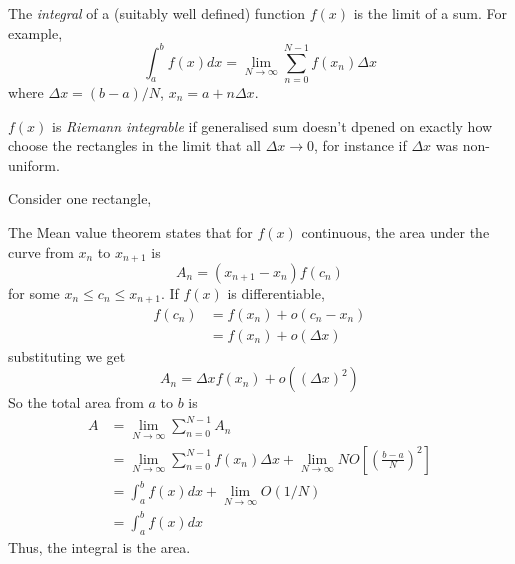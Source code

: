 \documentclass[12pt]{article}
\begin{document}
\begin{definition}
    The \emph{integral} of a (suitably well defined)
    function $f(x)$ is the limit of a sum. For example,
    \[
        \int_{a}^{b}f(x)dx = \lim_{N\to\infty}\sum_{n=0}^{N-1} f(x_n)\Delta x
    \]
    where $\Delta x = (b-a)/N$, $x_n = a + n\Delta x$.
\end{definition}

\begin{center}
\end{center}

$f(x)$ is \emph{Riemann integrable} if generalised sum
doesn't dpened on exactly how choose the rectangles in the limit
that all $\Delta x \to 0$, for instance if $\Delta x$ was non-uniform.

Consider one rectangle,
\begin{center}
\end{center}


The Mean value theorem states that
for $f(x)$ continuous, the area under the curve from $x_n$ to $x_{n+1}$ is
\[
A_n = (x_{n+1}-x_n)f(c_n)
\]
for some $x_n \le c_n \le x_{n+1}$.
If $f(x)$ is differentiable,
\begin{align*}
    f(c_n) &= f(x_n) + o(c_n - x_n)\\
           &= f(x_n) + o(\Delta x)
\end{align*}
substituting we get
\[
A_n = \Delta x f(x_n) + o((\Delta x)^{2})
\]
So the total area from $a$ to $b$ is
\begin{align*}
    A &= \lim_{N \to \infty} \sum_{n=0}^{N-1}A_n\\
      &= \lim_{N\to\infty} \sum_{n=0}^{N-1}f(x_n)\Delta x 
      + \lim_{N\to\infty} N O \left[\left(\frac{b-a}{N}\right)^{2}\right]\\
      &= \int_a^b f(x) dx + \lim_{N\to\infty}O(1/N)\\
      &= \int_a^b f(x) dx
\end{align*}
Thus, the integral is the area.
\end{document}
